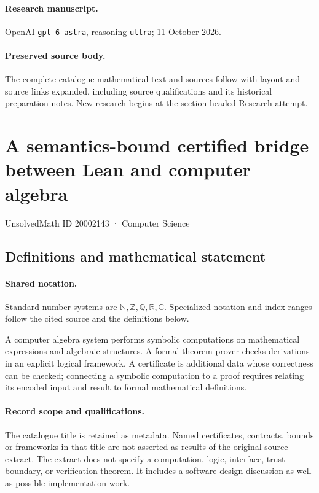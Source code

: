 \documentclass[11pt]{article}
\begin{document}
\paragraph{Research manuscript.} OpenAI \texttt{gpt-6-astra}, reasoning \texttt{ultra}; 11 October 2026.
\paragraph{Preserved source body.} The complete catalogue mathematical text and sources follow with layout and source links expanded, including source qualifications and its historical preparation notes. New research begins at the section headed Research attempt.

\section{A semantics-bound certified bridge between Lean and computer algebra}\label{20002143}
{\small UnsolvedMath ID 20002143 · Computer Science}
\subsection{Definitions and mathematical statement}

\paragraph{Shared notation.}Standard number systems are $\mathbb N,\mathbb Z,\mathbb Q,\mathbb R,\mathbb C$. Specialized notation and index ranges follow the cited source and the definitions below.


A computer algebra system performs symbolic computations on mathematical expressions and algebraic structures. A formal theorem prover checks derivations in an explicit logical framework. A certificate is additional data whose correctness can be checked; connecting a symbolic computation to a proof requires relating its encoded input and result to formal mathematical definitions.
\paragraph{Record scope and qualifications.}
The catalogue title is retained as metadata. Named certificates, contracts, bounds or frameworks in that title are not asserted as results of the original source extract.
The extract does not specify a computation, logic, interface, trust boundary, or verification theorem. It includes a software-design discussion as well as possible implementation work.
\end{document}
